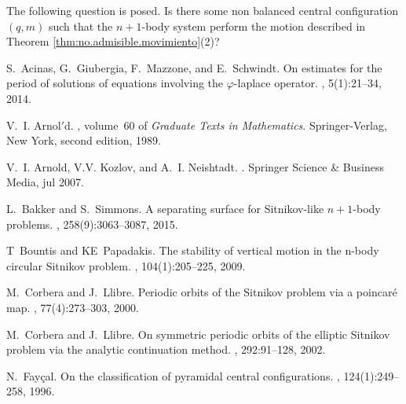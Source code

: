 \documentclass[smallcondensed]{svjour3}
\begin{document}
\begin{remark}
 The following question is posed. Is there some non balanced central configuration $(q,m)$ such that the $n+1$-body system perform the motion described in Theorem \ref{thm:no.admisible.movimiento}(2)?
\end{remark}




\def\cprime{$'$}
\begin{thebibliography}{10}

S.~Acinas, G.~Giubergia, F.~Mazzone, and E.~Schwindt.
\newblock On estimates for the period of solutions of equations involving the
  $\varphi$-laplace operator.
,
  5(1):21--34, 2014.

V.~I. Arnol{\cprime}d.
, volume~60 of {\em
  Graduate Texts in Mathematics}.
\newblock Springer-Verlag, New York, second edition, 1989.

V.~I. Arnold, V.V. Kozlov, and A.~I. Neishtadt.
.
\newblock Springer Science \& Business Media, jul 2007.

L.~Bakker and S.~Simmons.
\newblock A separating surface for {S}itnikov-like $n+ 1$-body problems.
, 258(9):3063--3087, 2015.

T~Bountis and KE~Papadakis.
\newblock The stability of vertical motion in the n-body circular {S}itnikov
  problem.
, 104(1):205--225,
  2009.

M.~Corbera and J.~Llibre.
\newblock Periodic orbits of the {S}itnikov problem via a poincar{\'e} map.
, 77(4):273--303,
  2000.

M.~Corbera and J.~Llibre.
\newblock On symmetric periodic orbits of the elliptic {S}itnikov problem via
  the analytic continuation method.
, 292:91--128, 2002.

N.~Fay{\c{c}}al.
\newblock On the classification of pyramidal central configurations.
,
  124(1):249--258, 1996.


\end{thebibliography}
\end{document}
